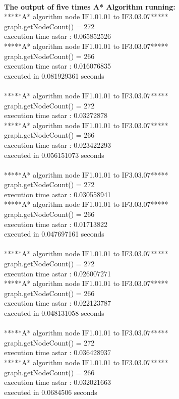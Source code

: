 \\\textbf{The output of five times A* Algorithm running:}
\\*****A* algorithm node IF1.01.01 to IF3.03.07*****
\\graph.getNodeCount() = 272
\\execution time astar : 0.065852526
\\*****A* algorithm node IF1.01.01 to IF3.03.07*****
\\graph.getNodeCount() = 266
\\execution time astar : 0.016076835
\\executed in 0.081929361 seconds
\\
\\*****A* algorithm node IF1.01.01 to IF3.03.07*****
\\graph.getNodeCount() = 272
\\execution time astar : 0.03272878
\\*****A* algorithm node IF1.01.01 to IF3.03.07*****
\\graph.getNodeCount() = 266
\\execution time astar : 0.023422293
\\executed in 0.056151073 seconds
\\
\\*****A* algorithm node IF1.01.01 to IF3.03.07*****
\\graph.getNodeCount() = 272
\\execution time astar : 0.030558941
\\*****A* algorithm node IF1.01.01 to IF3.03.07*****
\\graph.getNodeCount() = 266
\\execution time astar : 0.01713822
\\executed in 0.047697161 seconds
\\
\\*****A* algorithm node IF1.01.01 to IF3.03.07*****
\\graph.getNodeCount() = 272
\\execution time astar : 0.026007271
\\*****A* algorithm node IF1.01.01 to IF3.03.07*****
\\graph.getNodeCount() = 266
\\execution time astar : 0.022123787
\\executed in 0.048131058 seconds
\\
\\*****A* algorithm node IF1.01.01 to IF3.03.07*****
\\graph.getNodeCount() = 272
\\execution time astar : 0.036428937
\\*****A* algorithm node IF1.01.01 to IF3.03.07*****
\\graph.getNodeCount() = 266
\\execution time astar : 0.032021663
\\executed in 0.0684506 seconds
\\\\

